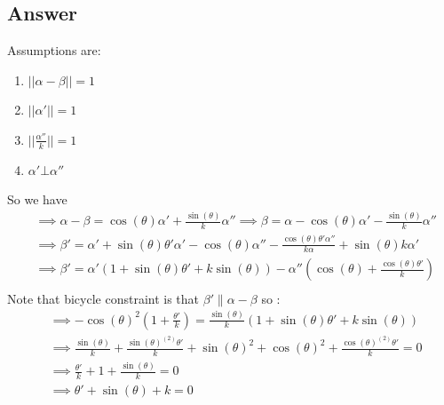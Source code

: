 \documentclass[
	12pt, %
]{fphw}
\theoremstyle{plain}
\begin{document}
\subsection*{Answer}
Assumptions are:
\begin{enumerate}
     \item $||\alpha - \beta|| = 1$
     \item $||\alpha'|| = 1$
     \item $||\frac{\alpha''}{k}|| = 1$
     \item $\alpha'\bot\alpha''$
\end{enumerate}
So we have
\begin{align*}
     &\implies	\alpha - \beta = \cos(\theta)\alpha' + \frac{\sin(\theta)}{k}\alpha'' \implies\beta = \alpha - \cos(\theta)\alpha' - \frac{\sin(\theta)}{k}\alpha''\\
     &\implies \beta' =\alpha' + \sin(\theta)\theta'\alpha' - \cos(\theta)\alpha'' - \frac{\cos(\theta)\theta'\alpha''}{k\alpha} + \sin(\theta)k\alpha'\\
     &\implies \beta' =\alpha'(1 + \sin(\theta)\theta' + k\sin(\theta)) - \alpha''(\cos(\theta) + \frac{\cos(\theta)\theta'}{k})\\
\end{align*}
Note that bicycle constraint is that $\beta' \parallel \alpha - \beta$ so :
\begin{align*}
     &\implies-\cos(\theta)^2 ( 1 + \frac{\theta'}{k}) = \frac{\sin(\theta)}{k}(1 + \sin(\theta)\theta' + k\sin(\theta))\\
     &\implies\frac{\sin(\theta)}{k} + \frac{\sin(\theta)^(2)\theta'}{k} + \sin(\theta)^2 + \cos(\theta)^2 + \frac{\cos(\theta)^(2)\theta'}{k} = 0\\
     &\implies\frac{\theta'}{k} + 1 + \frac{\sin(\theta)}{k} = 0\\
     &\implies\theta' + \sin(\theta) + k = 0\\
\end{align*}
\end{document}
